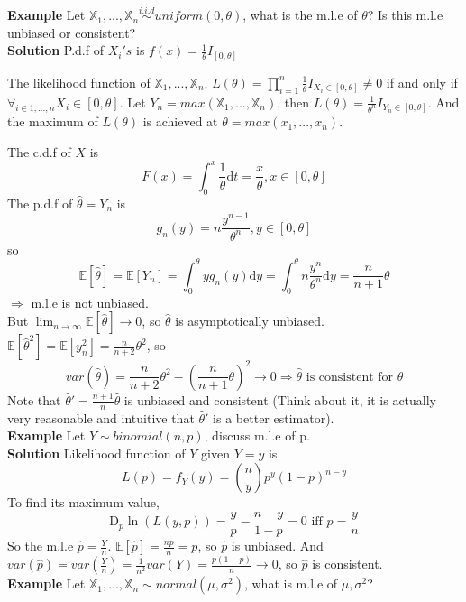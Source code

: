 \textbf{Example} Let $\mathbb{X}_1, ..., \mathbb{X}_n \overset{i.i.d}{\sim} uniform(0, \theta)$, what is the m.l.e of $\theta$? Is this m.l.e unbiased or consistent?\\

\textbf{Solution} P.d.f of $X_i's$ is $f(x) = \frac{1}{\theta} I_{[0, \theta]}$

The likelihood function of $\mathbb{X}_1, ..., \mathbb{X}_n$, $L(\theta) = \prod_{i=1}^n \frac{1}{\theta} I_{X_i \in [0, \theta]} \neq 0$ if and only if $\forall_{i\in 1, ..., n} X_i \in [0, \theta]$. Let $Y_n = max(\mathbb{X}_1, ..., \mathbb{X}_n)$, then $L(\theta) = \frac{1}{\theta^n}I_{Y_n \in [0, \theta]}$. And the maximum of $L(\theta)$ is achieved at $\theta = max(x_1, ..., x_n)$.

The c.d.f of $X$ is
$$F(x) = \int_0^x \frac{1}{\theta}\mathrm{d}t = \frac{x}{\theta}, x\in [0, \theta]$$
The p.d.f of $\hat{\theta} = Y_n$ is
$$g_n(y) = n\frac{y^{n-1}}{\theta^n}, y \in [0, \theta]$$
so
$$\mathbb{E}[ \hat{\theta} ] = \mathbb{E}[Y_n] = \int_0^\theta y g_n(y) \mathrm{d}y = \int_0^\theta n\frac{y^n}{\theta^n} \mathrm{d}y = \frac{n}{n+1}\theta$$
$\Rightarrow$ m.l.e is not unbiased.\\

But
$\lim_{n\to\infty} \mathbb{E}[\hat{\theta}] \to 0$, so $\hat{\theta}$ is asymptotically unbiased. $\mathbb{E}[\hat{\theta}^2] = \mathbb{E}[y_n^2] = \frac{n}{n+2}\theta^2$, so
$$var(\hat{\theta}) = \frac{n}{n+2}\theta^2 - (\frac{n}{n+1}\theta)^2  \to 0 \Rightarrow \hat{\theta}\text{ is consistent for } \theta$$
Note that $\hat{\theta}' = \frac{n+1}{n}\hat{\theta}$ is unbiased and consistent (Think about it, it is actually very reasonable and intuitive that $\hat{\theta}'$ is a better estimator).\\

\textbf{Example} Let $Y \sim binomial(n, p)$, discuss m.l.e of p.\\

\textbf{Solution} Likelihood function of $Y$ given $Y=y $ is
$$L(p) = f_Y(y) = {n \choose y}p^y(1-p)^{n-y}$$
To find its maximum value, 
$$\mathrm{D}_p \ln( L(y, p) ) = \frac{y}{p} - \frac{n-y}{1-p} = 0 \text{ iff } p = \frac{y}{n}$$
So the m.l.e $\hat{p} = \frac{Y}{n}$. $\mathbb{E}[\hat{p}] = \frac{np}{n} = p$, so $\hat{p}$ is unbiased. 
And $var(\hat{p}) = var(\frac{Y}{n}) = \frac{1}{n^2}var(Y) = \frac{p(1-p)}{n} \to 0$, so $\hat{p}$ is consistent.\\

\textbf{Example} Let $\mathbb{X}_1, ..., \mathbb{X}_n \sim normal(\mu, \sigma^2)$, what is m.l.e of $\mu, \sigma^2$?\\

